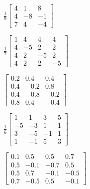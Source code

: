 \begin{exercise}
\begin{Parts}
\begin{OmitV1}
\item \(\frac19\begin{bmatrix} 4&1&8
\\4&-8&-1
\\7&4&-4 \end{bmatrix}\)
\end{OmitV1}

\item \(\frac17\begin{bmatrix} 1&4&4&4
\\4&-5&2&2
\\4&2&-5&2
\\4&2&2&-5 \end{bmatrix}\)

\item \(\begin{bmatrix} 0.2&0.4&0.4
\\0.4&-0.2&0.8
\\0.4&-0.8&-0.2
\\0.8&0.4&-0.4 \end{bmatrix}\)

\item \(\frac16\begin{bmatrix} 1&1&3&5
\\-5&-3&1&1
\\3&-5&-1&1
\\1&-1&5&3 \end{bmatrix}\)

\item \(\begin{bmatrix} 0.1&0.5&0.5&0.7
\\0.5&-0.1&-0.7&0.5
\\0.5&0.7&-0.1&-0.5
\\0.7&-0.5&0.5&-0.1 \end{bmatrix}\)

\end{Parts}
\end{exercise}


